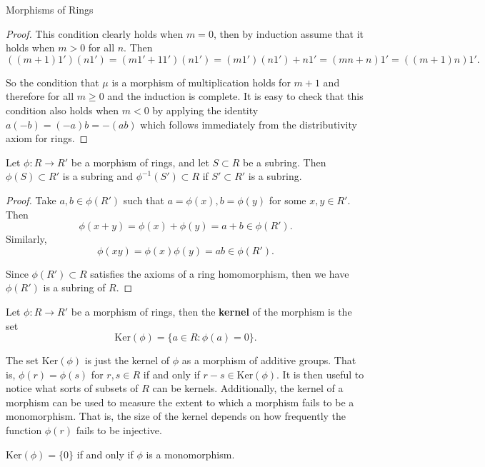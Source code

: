 \begin{section}{Morphisms of Rings}
\begin{proof}
This condition clearly holds when $m = 0$, then by induction assume that it holds when $m > 0$ for all $n$. Then 
$$((m+1)1')(n1') = (m1' + 11')(n1') = (m1')(n1') + n1' = (mn +n)1' = ((m+1)n)1'.$$

So the condition that $\mu$ is a morphism of multiplication holds for $m+1$ and therefore for all $m \geq 0$ and the induction is complete. It is easy to check that this condition also holds when $m < 0$ by applying the identity $a(-b) = (-a)b = -(ab)$ which follows immediately from the distributivity axiom for rings.
\end{proof}

\begin{prop}
Let $\phi \colon R \to R'$ be a morphism of rings, and let $S \subset R$ be a subring. Then $\phi(S) \subset R'$ is a subring and $\phi^{-1}(S') \subset R$ if $S' \subset R'$ is a subring.
\end{prop}

\begin{proof}
  Take $a,b \in \phi(R')$ such that $a = \phi(x), b = \phi(y)$ for some $x,y \in R'$. Then $$\phi(x+y) = \phi(x) + \phi(y) = a + b \in \phi(R').$$ Similarly,
  $$\phi(xy) = \phi(x)\phi(y) = ab \in \phi(R').$$

  Since $\phi(R') \subset R$ satisfies the axioms of a ring homomorphism, then we have $\phi(R')$ is a subring of $R$.
\end{proof}

\begin{defn}
Let $\phi \colon R \to R'$ be a morphism of rings, then the {\bf kernel} of the morphism is the set $$\textrm{Ker}(\phi) = \{a \in R \colon \phi(a) = 0\}.$$
\end{defn}

\begin{rmk}
The set $\textrm{Ker}(\phi)$ is just the kernel of $\phi$ as a morphism of additive groups. That is, $\phi(r) = \phi(s)$ for $r,s \in R$ if and only if $r - s \in \textrm{Ker}(\phi)$. It is then useful to notice what sorts of subsets of $R$ can be kernels. Additionally, the kernel of a morphism can be used to measure the extent to which a morphism fails to be a monomorphism. That is, the size of the kernel depends on how frequently the function $\phi(r)$ fails to be injective. 
\end{rmk}

\begin{prop}
  $\textrm{Ker}(\phi) = \{0\}$ if and only if $\phi$ is a monomorphism.
\end{prop}


\end{section}
